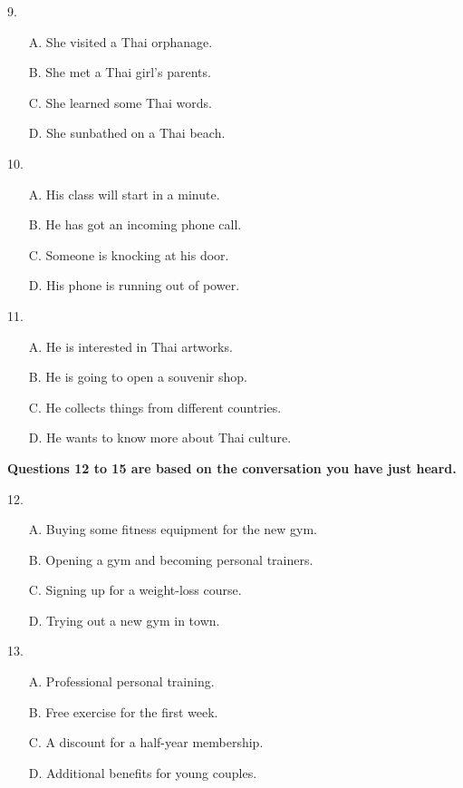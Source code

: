 \documentclass[UTF8,11pt]{ctexart}
\begin{document}
9.


\begin{itemize}[leftmargin=2em,itemsep=.2em,topsep=.4em]\item[A.] She visited a Thai orphanage.
\item[B.] She met a Thai girl's parents.
\item[C.] She learned some Thai words.
\item[D.] She sunbathed on a Thai beach.
\end{itemize}

10.


\begin{itemize}[leftmargin=2em,itemsep=.2em,topsep=.4em]\item[A.] His class will start in a minute.
\item[B.] He has got an incoming phone call.
\item[C.] Someone is knocking at his door.
\item[D.] His phone is running out of power.
\end{itemize}

11.


\begin{itemize}[leftmargin=2em,itemsep=.2em,topsep=.4em]\item[A.] He is interested in Thai artworks.
\item[B.] He is going to open a souvenir shop.
\item[C.] He collects things from different countries.
\item[D.] He wants to know more about Thai culture.
\end{itemize}

\textbf{Questions 12 to 15 are based on the conversation you have just heard.}


12.


\begin{itemize}[leftmargin=2em,itemsep=.2em,topsep=.4em]\item[A.] Buying some fitness equipment for the new gym.
\item[B.] Opening a gym and becoming personal trainers.
\item[C.] Signing up for a weight-loss course.
\item[D.] Trying out a new gym in town.
\end{itemize}

13.


\begin{itemize}[leftmargin=2em,itemsep=.2em,topsep=.4em]\item[A.] Professional personal training.
\item[B.] Free exercise for the first week.
\item[C.] A discount for a half-year membership.
\item[D.] Additional benefits for young couples.
\end{itemize}
\end{document}
